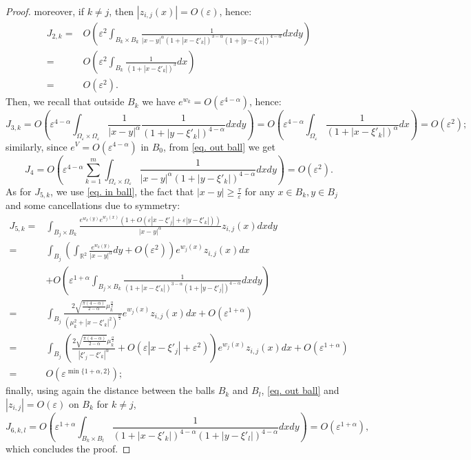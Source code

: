 \documentclass[11pt]{article}
\begin{document}
\begin{proof}
moreover, if $k\ne j$, then $|z_{i,j}(x)|=O(\varepsilon)$, hence:
\begin{align*}
J_{2,k}=&O\left(\varepsilon^2\int_{B_k\times B_k}\frac1{|x-y|^\alpha\left(1+\left|x-\xi'_k\right|\right)^{3-\alpha}\left(1+\left|y-\xi'_k\right|\right)^{4-\alpha}}dxdy\right)\\
=&O\left(\varepsilon^2\int_{B_k}\frac1{\left(1+\left|x-\xi'_k\right|\right)^3}dx\right)\\
=&O\left(\varepsilon^2\right).
\end{align*}
Then, we recall that outside $B_k$ we have $e^{w_k}=O\left(\varepsilon^{4-\alpha}\right)$, hence:
$$J_{3,k}=O\left(\varepsilon^{4-\alpha}\int_{\Omega_\varepsilon\times\Omega_\varepsilon}\frac1{|x-y|^\alpha}\frac1{\left(1+\left|y-\xi'_k\right|\right)^{4-\alpha}}dxdy\right)=O\left(\varepsilon^{4-\alpha}\int_{\Omega_\varepsilon}\frac1{\left(1+\left|x-\xi'_k\right|\right)^\alpha}dx\right)=O\left(\varepsilon^2\right);$$
similarly, since $e^V=O\left(\varepsilon^{4-\alpha}\right)$ in $B_0$, from \eqref{eq. out ball} we get
$$J_4=O\left(\varepsilon^{4-\alpha}\sum_{k=1}^m\int_{\Omega_\varepsilon\times\Omega_\varepsilon}\frac1{|x-y|^\alpha\left(1+\left|y-\xi'_k\right|\right)^{4-\alpha}}dxdy\right)=O\left(\varepsilon^2\right).$$
As for $J_{5,k}$, we use \eqref{eq. in ball}, the fact that $|x-y|\ge\frac\tau\varepsilon$ for any $x\in B_k,y\in B_j$ and some cancellations due to symmetry:
\begin{align*}
J_{5,k}=&\int_{B_j\times B_k}\frac{e^{w_k(y)}e^{w_j(x)}\left(1+O\left(\varepsilon\left|x-\xi'_j\right|+\varepsilon\left|y-\xi'_k\right|\right)\right)}{|x-y|^\alpha}z_{i,j}(x)dxdy\\
=&\int_{B_j}\left(\int_{\mathbb R^2}\frac{e^{w_k(y)}}{|x-y|^\alpha}dy+O\left(\varepsilon^2\right)\right)e^{w_j(x)}z_{i,j}(x)dx\\
&+O\left(\varepsilon^{1+\alpha}\int_{B_j\times B_k}\frac1{\left(1+\left|x-\xi'_k\right|\right)^{3-\alpha}\left(1+\left|y-\xi'_j\right|\right)^{4-\alpha}}dxdy\right)\\
=&\int_{B_j}\frac{2\sqrt{\frac{\pi(4-\alpha)}{2-\alpha}}\mu_k^\frac\alpha2}{\left(\mu_k^2+\left|x-\xi'_k\right|^2\right)^{\frac\alpha2}}e^{w_j(x)}z_{i,j}(x)dx+O\left(\varepsilon^{1+\alpha}\right)\\
=&\int_{B_j}\left(\frac{2\sqrt{\frac{\pi(4-\alpha)}{2-\alpha}}\mu_k^\frac\alpha2}{\left|\xi'_j-\xi'_k\right|^\alpha}+O\left(\varepsilon\left|x-\xi'_j\right|+\varepsilon^2\right)\right)e^{w_j(x)}z_{i,j}(x)dx+O\left(\varepsilon^{1+\alpha}\right)\\
=&O\left(\varepsilon^{\min\{1+\alpha,2\}}\right);
\end{align*}
finally, using again the distance between the balls $B_k$ and $B_l$, \eqref{eq. out ball} and $|z_{i,j}|=O(\varepsilon)$ on $B_k$ for $k\ne j$,
$$J_{6,k,l}=O\left(\varepsilon^{1+\alpha}\int_{B_k\times B_l}\frac1{\left(1+\left|x-\xi'_k\right|\right)^{4-\alpha}\left(1+\left|y-\xi'_l\right|\right)^{4-\alpha}}dxdy\right)=O\left(\varepsilon^{1+\alpha}\right),$$
which concludes the proof.
\end{proof}\
\end{document}
